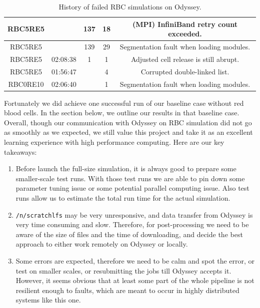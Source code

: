 \documentclass[11pt]{article} %
\newcommand{\tty}[1]{\texttt{#1}}
\begin{document}
\begin{table}[H]
\begin{tabular}{|c|c|c|c|c|}
RBC5RE5           &                   & 137                & 18                                  & (MPI) InfiniBand retry count exceeded.                 \\ \hline
RBC5RE5           &                   & 139                & 29                                  & Segmentation fault when loading modules.                                                \\ \hline
RBC5RE5           &  02:08:38        & 1                & 1                                  & Adjusted cell release is still abrupt.                                                \\ \hline
RBC5RE5           &  01:56:47        &                 & 4                                  & Corrupted double-linked list.                                              \\ \hline
RBC0RE10           &  02:06:40        &                 & 1                                  & Segmentation fault when loading modules.                                              \\ \hline
\end{tabular}
\caption{History of failed RBC simulations on Odyssey.}
\end{table}

Fortunately we did achieve one successful run of our baseline case without red blood cells. In the section below, we outline our results in that baseline case. Overall, though our communication with Odyssey on RBC simulation did not go as smoothly as we expected, we still value this project and take it as an excellent learning experience with high performance computing. Here are our key takeaways:
\begin{enumerate}
    \item Before launch the full-size simulation, it is always good to prepare some smaller-scale test runs. With those test runs we are able to pin down some parameter tuning issue or some potential parallel computing issue. Also test runs allow us to estimate the total run time for the actual simulation.
    \item \tty{/n/scratchlfs} may be very unresponsive, and data transfer from Odyssey is very time consuming and slow. Therefore, for post-processing we need to be aware of the size of files and the time of downloading, and decide the best approach to either work remotely on Odyssey or locally.
    \item Some errors are expected, therefore we need to be calm and spot the error, or test on smaller scales, or resubmitting the jobs till Odyssey accepts it. However, it seems obvious that at least some part of the whole pipeline is not resilient enough to faults, which are meant to occur in highly distributed systems like this one.
\end{enumerate}
\end{document}

